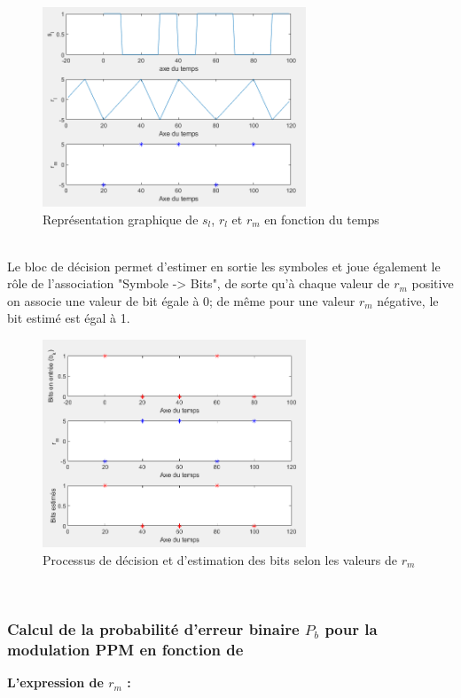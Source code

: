 \documentclass{rapport}
\begin{document}
{\begin{figure}[H]
    \centering
    \includegraphics[width=0.7\textwidth]{logos/signaux.PNG}
    \caption{Représentation graphique de $s_l$, $r_l$ et $r_m$ en fonction du temps}
\end{figure}\\

Le bloc de décision permet d'estimer en sortie les symboles et joue également le rôle de l'association "Symbole -> Bits", de sorte qu'à chaque valeur de $r_m$ positive on associe une valeur de bit égale à 0; de même pour une valeur $r_m$ négative, le bit estimé est égal à 1.  

\begin{figure}[H]
    \centering
    \includegraphics[width=0.7\textwidth]{logos/bits.PNG}
    \caption{Processus de décision et d'estimation des bits selon les valeurs de $r_m$}
\end{figure}\\

\subsubsection{\large Calcul de la probabilité d'erreur binaire $P_b$ pour la modulation PPM en fonction de }
\textbf{L’expression de $r_m$ :}

}
\end{document}
